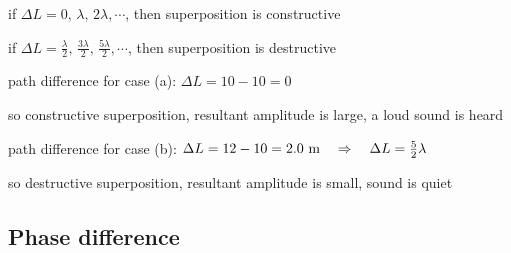 {

\centering
\vspace*{6pt}
\begin{tcolorbox}[colframe=red, colback=yellow!30, width=0.65\textwidth]
	\setlength{\baselineskip}{\baselineskip}%
	
	\centering
	
	if ${\Delta L = 0, \, \lambda, \, 2\lambda, \cdots}$, then superposition is constructive
	
	if ${\Delta L = \frac{\lambda}{2}, \, \frac{3\lambda}{2}, \, \frac{5\lambda}{2}, \cdots}$, then superposition is destructive
	
\end{tcolorbox}\vspace*{-4pt}

}

\newpage


\begin{soln} path difference for case (a): $\Delta L = 10 - 10  = 0$

so constructive superposition, resultant amplitude is large, a loud sound is heard

path difference for case (b): $\Delta L = 12 - 10 = 2.0 \text{ m} \quad \Rightarrow \quad \Delta L = \frac{5}{2}\lambda$

so destructive superposition, resultant amplitude is small, sound is quiet \end{soln}

\subsection{Phase difference}

